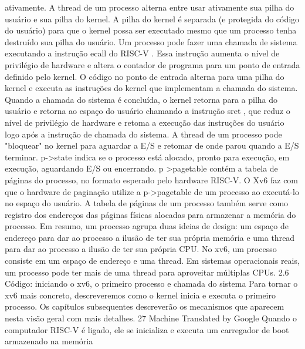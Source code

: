ativamente.  A  thread  de  um  processo  alterna  entre  usar  ativamente  sua  pilha  do  usuário  e  sua  pilha  do  kernel.
 A  pilha  do  kernel  é  separada  (e  protegida  do  código  do  usuário)  para  que  o  kernel  possa  ser  executado  mesmo  que  um  
processo  tenha  destruído  sua  pilha  do  usuário.
 Um  processo  pode  fazer  uma  chamada  de  sistema  executando  a  instrução  ecall  do  RISC-V .  Essa  instrução  aumenta  
o  nível  de  privilégio  de  hardware  e  altera  o  contador  de  programa  para  um  ponto  de  entrada  definido  pelo  kernel.
 O  código  no  ponto  de  entrada  alterna  para  uma  pilha  do  kernel  e  executa  as  instruções  do  kernel  que  implementam  a  
chamada  do  sistema.  Quando  a  chamada  do  sistema  é  concluída,  o  kernel  retorna  para  a  pilha  do  usuário  e  retorna  ao  
espaço  do  usuário  chamando  a  instrução  sret ,  que  reduz  o  nível  de  privilégio  de  hardware  e  retoma  a  execução  das  
instruções  do  usuário  logo  após  a  instrução  de  chamada  do  sistema.  A  thread  de  um  processo  pode  "bloquear"  no  kernel  
para  aguardar  a  E/S  e  retomar  de  onde  parou  quando  a  E/S  terminar.
 p->state  indica  se  o  processo  está  alocado,  pronto  para  execução,  em  execução,  aguardando  E/S  ou  encerrando.  
p
>pagetable  contém  a  tabela  de  páginas  do  processo,  no  formato  esperado  pelo  hardware  RISC-V.  O  Xv6  faz  com  
que  o  hardware  de  paginação  utilize  a  p->pagetable  de  um  processo  ao  executá-lo  no  espaço  do  usuário.  A  tabela  
de  páginas  de  um  processo  também  serve  como  registro  dos  endereços  das  páginas  físicas  alocadas  para  
armazenar  a  memória  do  processo.
 Em  resumo,  um  processo  agrupa  duas  ideias  de  design:  um  espaço  de  endereço  para  dar  ao  processo  a  ilusão  de  ter  
sua  própria  memória  e  uma  thread  para  dar  ao  processo  a  ilusão  de  ter  sua  própria  CPU.  No  xv6,  um  processo  consiste  
em  um  espaço  de  endereço  e  uma  thread.  Em  sistemas  operacionais  reais,  um  processo  pode  ter  mais  de  uma  thread  
para  aproveitar  múltiplas  CPUs.
 2.6  Código:  iniciando  o  xv6,  o  primeiro  processo  e  chamada  do  sistema
 Para  tornar  o  xv6  mais  concreto,  descreveremos  como  o  kernel  inicia  e  executa  o  primeiro  processo.  Os  capítulos  
subsequentes  descreverão  os  mecanismos  que  aparecem  nesta  visão  geral  com  mais  detalhes.
 27
Machine Translated by Google
 Quando  o  computador  RISC-V  é  ligado,  ele  se  inicializa  e  executa  um  carregador  de  boot  armazenado  na  memória  
